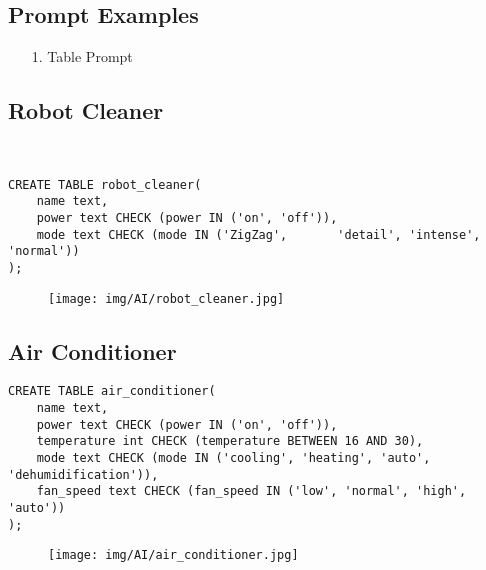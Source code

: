 \documentclass[conference]{IEEEtran}
\begin{document}
\subsection{Prompt Examples}



\begin{itemize}
    \item[1.] Table Prompt
\end{itemize}

\subsection*{Robot Cleaner}
\\
\begin{lstlisting}
CREATE TABLE robot_cleaner(
    name text,
    power text CHECK (power IN ('on', 'off')),
    mode text CHECK (mode IN ('ZigZag',       'detail', 'intense', 'normal'))
);
\end{lstlisting}
\begin{figure}[h]
\hspace{1.5cm}
\centering
\begin{minipage}{0.8\columnwidth}
    \texttt{[image: img/AI/robot\_cleaner.jpg]}
\end{minipage}
\end{figure}

\subsection*{Air Conditioner}
\begin{lstlisting}
CREATE TABLE air_conditioner(
    name text,
    power text CHECK (power IN ('on', 'off')),
    temperature int CHECK (temperature BETWEEN 16 AND 30),
    mode text CHECK (mode IN ('cooling', 'heating', 'auto', 'dehumidification')),
    fan_speed text CHECK (fan_speed IN ('low', 'normal', 'high', 'auto'))
);
\end{lstlisting}

\begin{figure}[h]
\hspace{1.5cm}
\centering
\begin{minipage}{0.8\columnwidth}
    \texttt{[image: img/AI/air\_conditioner.jpg]}
\end{minipage}
\end{figure}
\end{document}
